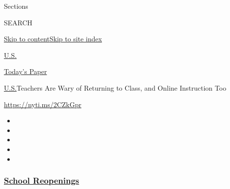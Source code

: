 Sections

SEARCH

\protect\hyperlink{site-content}{Skip to
content}\protect\hyperlink{site-index}{Skip to site index}

\href{https://www.nytimes3xbfgragh.onion/section/us}{U.S.}

\href{https://myaccount.nytimes3xbfgragh.onion/auth/login?response_type=cookie\&client_id=vi}{}

\href{https://www.nytimes3xbfgragh.onion/section/todayspaper}{Today's
Paper}

\href{/section/us}{U.S.}\textbar{}Teachers Are Wary of Returning to
Class, and Online Instruction Too

\url{https://nyti.ms/2CZkGpr}

\begin{itemize}
\item
\item
\item
\item
\item
\end{itemize}

\hypertarget{school-reopenings}{%
\subsubsection{\texorpdfstring{\href{https://www.nytimes3xbfgragh.onion/spotlight/schools-reopening?name=styln-coronavirus-schools-reopening\&region=TOP_BANNER\&block=storyline_menu_recirc\&action=click\&pgtype=Article\&impression_id=38515390-f4c5-11ea-96c6-737460281ea1\&variant=undefined}{School
Reopenings}}{School Reopenings}}\label{school-reopenings}}

